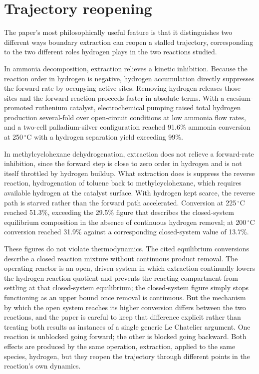 \documentclass[11pt]{article}
\begin{document}
\section{Trajectory reopening}

The paper's most philosophically useful feature is that it distinguishes two different ways boundary extraction can reopen a stalled trajectory, corresponding to the two different roles hydrogen plays in the two reactions studied.

In ammonia decomposition, extraction relieves a kinetic inhibition. Because the reaction order in hydrogen is negative, hydrogen accumulation directly suppresses the forward rate by occupying active sites. Removing hydrogen releases those sites and the forward reaction proceeds faster in absolute terms. With a caesium-promoted ruthenium catalyst, electrochemical pumping raised total hydrogen production several-fold over open-circuit conditions at low ammonia flow rates, and a two-cell palladium-silver configuration reached 91.6\% ammonia conversion at 250\,$^\circ$C with a hydrogen separation yield exceeding 99\%.

In methylcyclohexane dehydrogenation, extraction does not relieve a forward-rate inhibition, since the forward step is close to zero order in hydrogen and is not itself throttled by hydrogen buildup. What extraction does is suppress the reverse reaction, hydrogenation of toluene back to methylcyclohexane, which requires available hydrogen at the catalyst surface. With hydrogen kept scarce, the reverse path is starved rather than the forward path accelerated. Conversion at 225\,$^\circ$C reached 51.3\%, exceeding the 29.5\% figure that describes the closed-system equilibrium composition in the absence of continuous hydrogen removal; at 200\,$^\circ$C conversion reached 31.9\% against a corresponding closed-system value of 13.7\%.

These figures do not violate thermodynamics. The cited equilibrium conversions describe a closed reaction mixture without continuous product removal. The operating reactor is an open, driven system in which extraction continually lowers the hydrogen reaction quotient and prevents the reacting compartment from settling at that closed-system equilibrium; the closed-system figure simply stops functioning as an upper bound once removal is continuous. But the mechanism by which the open system reaches its higher conversion differs between the two reactions, and the paper is careful to keep that difference explicit rather than treating both results as instances of a single generic Le Chatelier argument. One reaction is unblocked going forward; the other is blocked going backward. Both effects are produced by the same operation, extraction, applied to the same species, hydrogen, but they reopen the trajectory through different points in the reaction's own dynamics.
\end{document}
